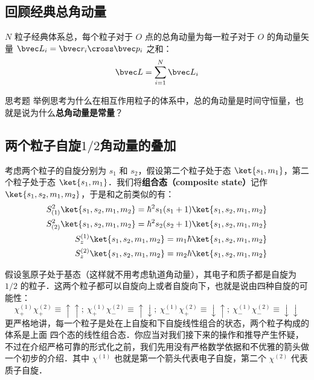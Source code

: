 \subsection{回顾经典总角动量}
$N$ 粒子经典体系总，每个粒子对于 $O$ 点的总角动量为每一粒子对于 $O$ 的角动量矢量 $\bvec L_i=\bvec r_i\cross\bvec p_i$ 之和：
\begin{equation}
\bvec L = \sum_{i=1}^N \bvec L_i
\end{equation}
\begin{exercise}{思考题}
举例思考为什么在相互作用粒子的体系中，总的角动量是时间守恒量，也就是说为什么\textbf{总角动量是常量}？
\end{exercise}
\subsection{两个粒子自旋$1/2$角动量的叠加}
考虑两个粒子的自旋分别为 $s_1$ 和 $s_2$，假设第二个粒子处于态 $\ket{s_1,m_1}$，第二个粒子处于态 $\ket{s_1,m_1}$．我们将\textbf{组合态（composite state）}记作 $\ket{s_1,s_2,m_1,m_2}$，于是和之前类似的有：
\begin{align}
S_{(1)}^2\ket{s_1,s_2,m_1,m_2} = \hbar^2 s_1(s_1+1)\ket{s_1,s_2,m_1,m_2}\\
S_{(2)}^2\ket{s_1,s_2,m_1,m_2} = \hbar^2 s_2(s_2+1)\ket{s_1,s_2,m_1,m_2}\\
S^{(1)}_z\ket{s_1,s_2,m_1,m_2} = m_1\hbar\ket{s_1,s_2,m_1,m_2}\\
S^{(2)}_z\ket{s_1,s_2,m_1,m_2} = m_2\hbar\ket{s_1,s_2,m_1,m_2}
\end{align}

假设氢原子处于基态（这样就不用考虑轨道角动量），其电子和质子都是自旋为 $1/2$ 的粒子．这两个粒子都可以自旋向上或者自旋向下，也就是说由四种自旋的可能性：
\begin{equation}
\chi^{(1)}_+\chi^{(2)}_+\equiv\uparrow\uparrow;\ \chi^{(1)}_+\chi^{(2)}_-\equiv\uparrow\downarrow;\ \chi^{(1)}_-\chi^{(2)}_+\equiv\downarrow\uparrow;\ \chi^{(1)}_-\chi^{(2)}_-\equiv\downarrow\downarrow
\end{equation}
更严格地讲，每一个粒子是处在上自旋和下自旋线性组合的状态，两个粒子构成的体系是上面
四个态的线性组合态．你应当对我们接下来的操作和推导产生怀疑，不过在介绍严格可靠的形式化之前，我们先用没有严格数学依据和不优雅的箭头做一个初步的介绍．其中 $\chi^{(1)}$ 也就是第一个箭头代表电子自旋，第二个 $\chi^{(2)}$ 代表质子自旋．

